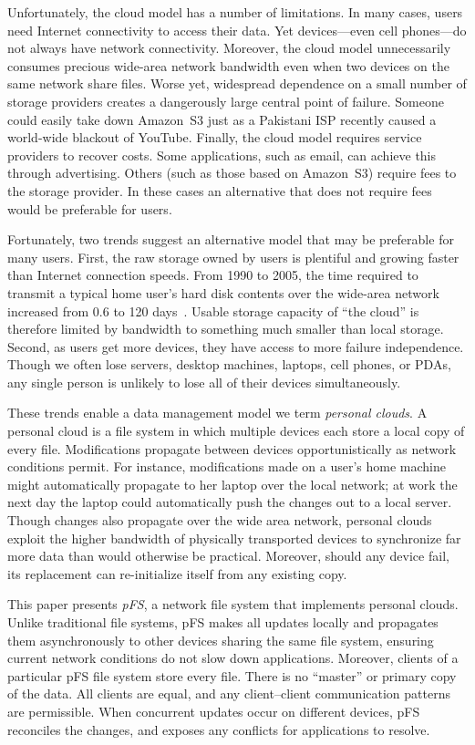 Unfortunately, the cloud model has a number of limitations.  In many
cases, users need Internet connectivity to access their data.  Yet
devices---even cell phones---do not always have network connectivity.
Moreover, the cloud model unnecessarily consumes precious wide-area
network bandwidth even when two devices on the same network share
files.  Worse yet, widespread dependence on a small number of storage
providers creates a dangerously large central point of failure.
Someone could easily take down Amazon~S3 just as a Pakistani ISP
recently caused a world-wide blackout of YouTube.  Finally, the cloud
model requires service providers to recover costs.  Some applications,
such as email, can achieve this through advertising.  Others (such as
those based on Amazon~S3) require fees to the storage provider.  In
these cases an alternative that does not require fees would be
preferable for users.

Fortunately, two trends suggest an alternative model that may be
preferable for many users.  First, the raw storage owned by users is
plentiful and growing faster than Internet connection speeds.  From
1990 to 2005, the time required to transmit a typical home user's hard
disk contents over the wide-area network increased from 0.6 to 120
days~\cite{rodrigues:multi-hop}.  Usable storage capacity of ``the
cloud'' is therefore limited by bandwidth to something much smaller
than local storage.  Second, as users get more devices, they have
access to more failure independence.  Though we often lose servers,
desktop machines, laptops, cell phones, or PDAs, any single person is
unlikely to lose all of their devices simultaneously.

These trends enable a data management model we term \emph{personal
  clouds}.  A personal cloud is a file system in which multiple
devices each store a local copy of every file.  Modifications
propagate between devices opportunistically as network conditions
permit.  For instance, modifications made on a user's home machine
might automatically propagate to her laptop over the local network; at
work the next day the laptop could automatically push the changes out
to a local server.  Though changes also propagate over the wide area
network, personal clouds exploit the higher bandwidth of physically
transported devices to synchronize far more data than would otherwise
be practical.  Moreover, should any device fail, its replacement can
re-initialize itself from any existing copy.

This paper presents \emph{pFS}, a network file system that implements
personal clouds.  Unlike traditional file systems, pFS makes all
updates locally and propagates them asynchronously to other devices
sharing the same file system, ensuring current network conditions do
not slow down applications.  Moreover, clients of a particular pFS
file system store every file.  There is no ``master'' or primary copy
of the data.  All clients are equal, and any client--client
communication patterns are permissible.  When concurrent updates occur
on different devices, pFS reconciles the changes, and exposes any
conflicts for applications to resolve.

